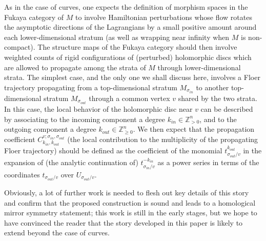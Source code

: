 \documentclass[11pt,leqno]{amsart}
\numberwithin{equation}{section}
\def\Z{\mathbb{Z}}
\begin{document}
As in the case of curves, one expects the definition of morphism spaces in the
Fukaya category of $M$ to involve Hamiltonian perturbations whose flow 
rotates the asymptotic directions of the Lagrangians by a small positive
amount around each lower-dimensional stratum (as well as
wrapping near infinity when $M$ is non-compact). 
The structure maps of the Fukaya category should then
involve weighted counts of rigid configurations of (perturbed) holomorphic
discs which are allowed to propagate among the strata of $M$
through lower-dimensional strata. The simplest case, and the only one we
shall discuss here, involves a Floer trajectory
propagating from a top-dimensional stratum $M_{\sigma_{in}}$ to another
top-dimensional stratum $M_{\sigma_{out}}$ through a common vertex $v$
shared by the two strata. In this case, the local behavior of the
holomorphic disc near $v$ can be described by
associating to the incoming component 
a degree $k_{in}\in \Z_{>0}^n$, and to the outgoing component a
degree $k_{out}\in \Z_{\geq 0}^n$. We then expect that the propagation 
coefficient $C^{v;\sigma_{in},\sigma_{out}}_{k_{in},k_{out}}$ (the
local contribution to the multiplicity of the propagating Floer
trajectory) should be defined as
the coefficient of the monomial $t^{k_{out}}_{\sigma_{out}/v}$ in the
expansion of (the analytic continuation of) $t_{\sigma_{in}/v}^{-k_{in}}$ 
as a power series in terms of the coordinates $t_{\sigma_{out}/v}$ over
$U_{\sigma_{out}/v}$. 

Obviously, a lot of further work is needed to flesh out key 
details of this story and confirm that the proposed construction is 
sound and leads to a homological mirror symmetry statement; this work
is still in the early stages, but we
hope to have convinced the reader that the story developed in this paper
is likely to extend beyond the case of curves.
\end{document}
